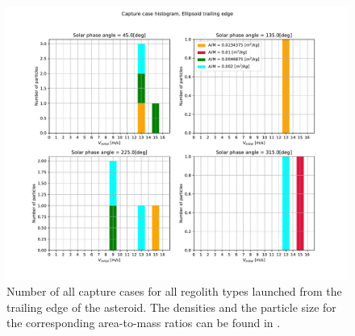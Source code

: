 \begin{figure}[htb]
\centering
\captionsetup{justification=centering}
\includegraphics[width=\textwidth, height=0.6\textheight, keepaspectratio=true]{trailing_edge_perturbations/allCaptureCases.pdf}
\caption{Number of all capture cases for all regolith types launched from the trailing edge of the asteroid. The densities and the particle size for the corresponding area-to-mass ratios can be found in .}
\label{fig:trailingEdge_allParticles_capture_hist}
\end{figure}
\FloatBarrier
